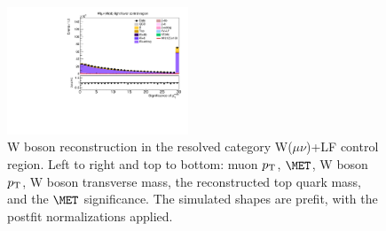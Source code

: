 \begin{figure}[tbp]
\begin{center}
    \includegraphics[width=0.48\textwidth]{figures/wlnhbb2016/resolved/WmnWHLightFlavorCR_pfmetsig.pdf}
    \caption{W boson reconstruction in the resolved category W($\mu\nu$)+LF control region.
    Left to right and top to bottom: muon $p_{\mathrm{T}}$, $\MET$, W boson $p_{\mathrm{T}}$, W boson transverse mass,
    the reconstructed top quark mass, and the $\MET$ significance.
    The simulated shapes are prefit, with the postfit normalizations applied.}
    \label{fig:res_WmnLF_WBosons}
  \end{center}
\end{figure}
\clearpage


